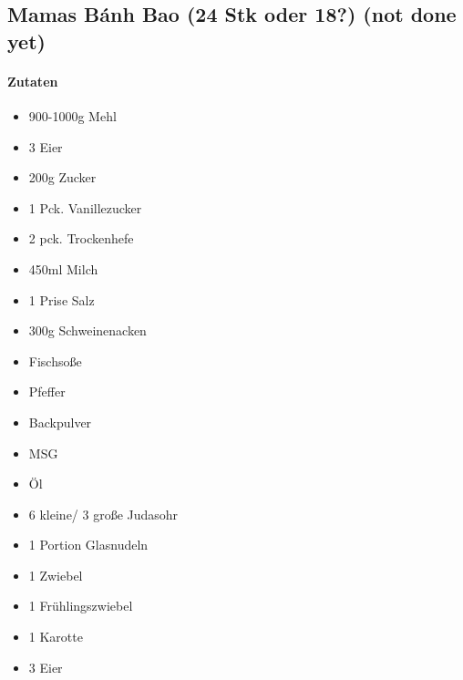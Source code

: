 \newpage
\subsection{Mamas Bánh Bao (24 Stk oder 18?) (not done yet)}
\paragraph{Zutaten}
\begin{itemize}[noitemsep]
	\item 900-1000g Mehl
	\item 3 Eier
	\item 200g Zucker
	\item 1 Pck. Vanillezucker
	\item 2 pck. Trockenhefe
	\item 450ml Milch
	\item 1 Prise Salz
	\item 300g Schweinenacken
	\item Fischsoße
	\item Pfeffer
	\item Backpulver
	\item MSG
	\item Öl
	\item 6 kleine/ 3 große Judasohr
	\item 1 Portion Glasnudeln
	\item 1 Zwiebel
	\item 1 Frühlingszwiebel
	\item 1 Karotte
	\item 3 Eier
\end{itemize}



